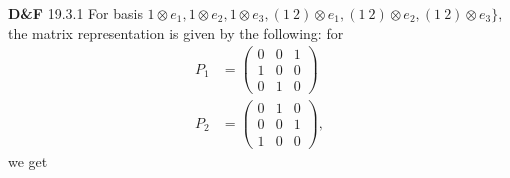 \documentclass[a4paper, 12pt]{article}
\theoremstyle{Mydefinition}
\theoremstyle{Mytheorem}
\begin{document}
\noindent \textbf{D\&F} 19.3.1
For basis $1\otimes e_1, 1\otimes e_2, 1\otimes e_3, (1~2)\otimes e_1, (1~2)\otimes e_2, (1~2)\otimes e_3\}$, the matrix representation is given by the following: for
\begin{equation}
    \begin{split}
        P_1 &= \begin{pmatrix}
        0 & 0 & 1\\
        1 & 0 & 0\\
        0 & 1 & 0
        \end{pmatrix}\\
        P_2 &= \begin{pmatrix}
        0 & 1 & 0\\
        0 & 0 & 1\\
        1 & 0 & 0
        \end{pmatrix},
    \end{split}
\end{equation}
we get
\end{document}
